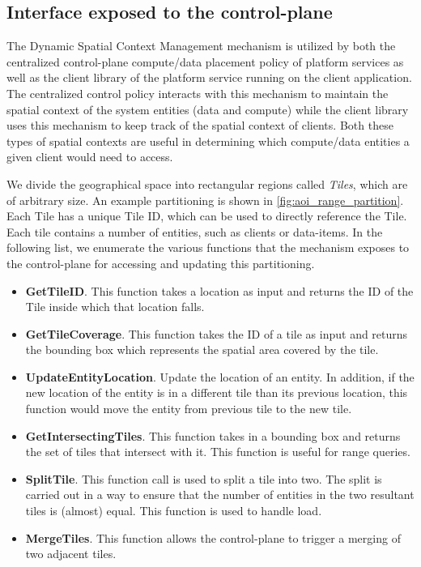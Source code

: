 \subsection{Interface exposed to the control-plane}
The Dynamic Spatial Context Management mechanism is utilized by both the centralized control-plane compute/data placement policy of platform services as well as the client library of the platform service running on the client application. The centralized control policy interacts with this mechanism to maintain the spatial context of the system entities (data and compute) while the client library uses this mechanism to keep track of the spatial context of clients. Both these types of spatial contexts are useful in determining which compute/data entities a given client would need to access. 
\par We divide the geographical space into rectangular regions called \textit{Tiles}, which are of arbitrary size.  An example partitioning is shown in \cref{fig:aoi_range_partition}. Each Tile has a unique Tile ID, which can be used to directly reference the Tile. Each tile contains a number of entities, such as clients or data-items. In the following list, we enumerate the various functions that the mechanism exposes to the control-plane for accessing and updating this partitioning.
\begin{itemize}
\item \textbf{GetTileID}. This function takes a location as input and returns the ID of the Tile inside which that location falls.
\item \textbf{GetTileCoverage}. This function takes the ID of a tile as input and returns the bounding box which represents the spatial area covered by the tile.
\item \textbf{UpdateEntityLocation}. Update the location of an entity. In addition, if the new location of the entity is in a different tile than its previous location, this function would move the entity from previous tile to the new tile. 
\item \textbf{GetIntersectingTiles}. This function takes in a bounding box and returns the set of tiles that intersect with it. This function is useful for range queries.
\item \textbf{SplitTile}. This function call is used to split a tile into two. The split is carried out in a way to ensure that the number of entities in the two resultant tiles is (almost) equal. This function is used to handle load.
\item \textbf{MergeTiles}. This function allows the control-plane to trigger a merging of two adjacent tiles.
\end{itemize}

